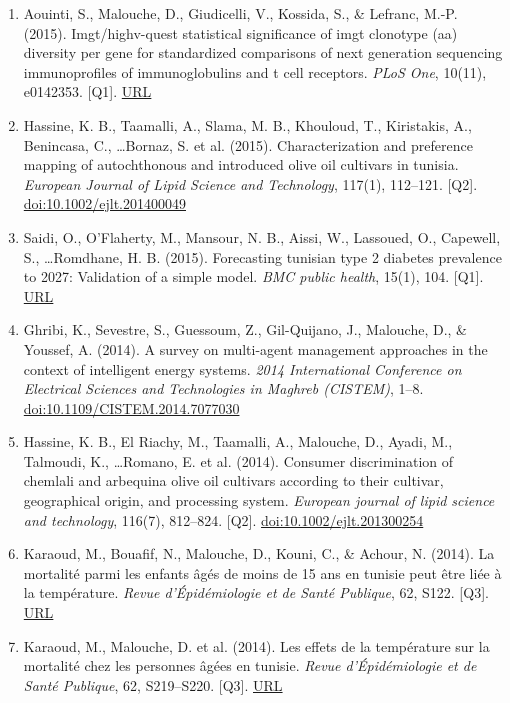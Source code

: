 \documentclass[11pt,a4paper,sans]{moderncv}
\begin{document}
\begin{enumerate}
\item Aouinti, S., Malouche, D., Giudicelli, V., Kossida, S., \& Lefranc, M.-P. (2015). Imgt/highv-quest statistical significance of imgt clonotype (aa) diversity per gene for standardized comparisons of next generation sequencing immunoprofiles of immunoglobulins and t cell receptors. \textit{PLoS One}, 10(11), e0142353. [Q1]. \href{https://pubmed.ncbi.nlm.nih.gov/26540440/}{URL}
\item Hassine, K. B., Taamalli, A., Slama, M. B., Khouloud, T., Kiristakis, A., Benincasa, C., \ldots Bornaz, S. et al. (2015). Characterization and preference mapping of autochthonous and introduced olive oil cultivars in tunisia. \textit{European Journal of Lipid Science and Technology}, 117(1), 112–121. [Q2]. \href{https://doi.org/10.1002/ejlt.201400049}{doi:10.1002/ejlt.201400049}
\item Saidi, O., O'Flaherty, M., Mansour, N. B., Aissi, W., Lassoued, O., Capewell, S., \ldots Romdhane, H. B. (2015). Forecasting tunisian type 2 diabetes prevalence to 2027: Validation of a simple model. \textit{BMC public health}, 15(1), 104. [Q1]. \href{https://bmcpublichealth.biomedcentral.com/articles/10.1186/s12889-015-1416-z}{URL}
\item Ghribi, K., Sevestre, S., Guessoum, Z., Gil-Quĳano, J., Malouche, D., \& Youssef, A. (2014). A survey on multi-agent management approaches in the context of intelligent energy systems. \textit{2014 International Conference on Electrical Sciences and Technologies in Maghreb (CISTEM)}, 1–8. \href{https://doi.org/10.1109/CISTEM.2014.7077030}{doi:10.1109/CISTEM.2014.7077030}
\item Hassine, K. B., El Riachy, M., Taamalli, A., Malouche, D., Ayadi, M., Talmoudi, K., \ldots Romano, E. et al. (2014). Consumer discrimination of chemlali and arbequina olive oil cultivars according to their cultivar, geographical origin, and processing system. \textit{European journal of lipid science and technology}, 116(7), 812–824. [Q2]. \href{https://doi.org/10.1002/ejlt.201300254}{doi:10.1002/ejlt.201300254}
\item Karaoud, M., Bouafif, N., Malouche, D., Kouni, C., \& Achour, N. (2014). La mortalité parmi les enfants âgés de moins de 15 ans en tunisie peut être liée à la température. \textit{Revue d'Épidémiologie et de Santé Publique}, 62, S122. [Q3]. \href{https://www.em-consulte.com/article/911510/article/la-mortalite-parmi-les-enfants-ages-de-moins-de15}{URL}
\item Karaoud, M., Malouche, D. et al. (2014). Les effets de la température sur la mortalité chez les personnes âgées en tunisie. \textit{Revue d'Épidémiologie et de Santé Publique}, 62, S219–S220. [Q3]. \href{https://www.em-consulte.com/article/915656/les-effets-de-la-temperature-sur-la-mortalite-chez}{URL}

\end{enumerate}
\end{document}
